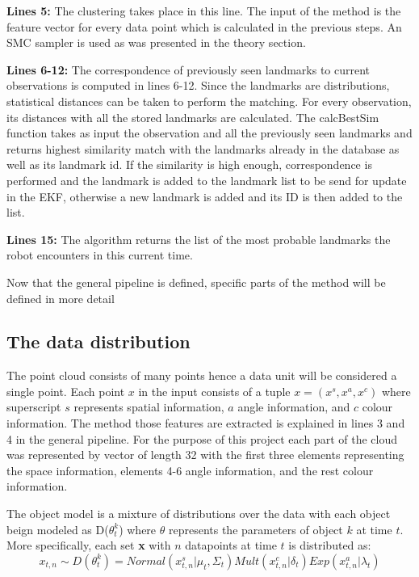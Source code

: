 \documentclass[twoside,hidelinks]{article}
\begin{document}
\textbf{Lines 5:} The clustering takes place in this line. The input of the method is the feature vector for every data point which is calculated in the previous steps. An SMC sampler is used as was presented in the theory section. 

\textbf{Lines 6-12:} The correspondence of previously seen landmarks to current observations is computed in lines 6-12. Since the landmarks are distributions, statistical distances can be taken to perform the matching. For every observation, its distances with all the stored landmarks are calculated. The calcBestSim function takes as input the observation and all the previously seen landmarks and returns highest similarity match with the landmarks already in the database as well as its landmark id. If the similarity is high enough, correspondence is performed and the landmark is added to the landmark list to be send for update in the EKF, otherwise a new landmark is added and its ID is then added to the list.

\textbf{Lines 15:} The algorithm returns the list of the most probable landmarks the robot encounters in this current time.


Now that the general pipeline is defined, specific parts of the method will be defined in more detail


\subsection{The data distribution}

The point cloud consists of many points hence a data unit will be considered a single point.
Each point $x$ in the input consists of a tuple $x =(x^s, x^a, x^c ) $ where superscript $s$ represents spatial information, $a$ angle information, and $c$ colour information. The method those features are extracted is explained in lines 3 and 4 in the general pipeline. For the purpose of this project each part of the cloud was represented by vector of length 32 with the first three elements representing the space information, elements 4-6 angle information, and the rest colour information.

The object model is a mixture of distributions over the data with each object beign modeled as D($\theta_t^k$) where $\theta$ represents the parameters of object $k$ at time $t$. More specifically, each set \textbf{x} with $n$ datapoints at time $t$ is distributed as:
$$ x_{t,n} \sim D(\theta_t^k) = Normal(x_{t,n}^s| \mu_t, \Sigma_t) Mult(x_{t,n}^c | \delta_t) Exp(x_{t,n}^a | \lambda_t) $$
\end{document}
